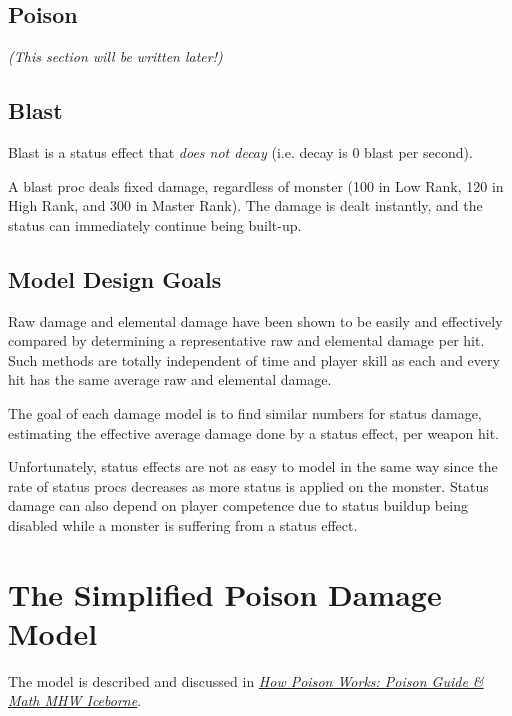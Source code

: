 \documentclass{article}
\begin{document}
\subsection{Poison}%
\label{sub:poison}

\textit{(This section will be written later!)}

\subsection{Blast}%
\label{sub:blast}

Blast is a status effect that \textit{does not decay} (i.e. decay is 0 blast per second).

A blast proc deals fixed damage, regardless of monster (100 in Low Rank, 120 in High Rank, and 300 in Master Rank). The damage is dealt instantly, and the status can immediately continue being built-up.

\subsection{Model Design Goals}%
\label{sub:model_design_goals}

Raw damage and elemental damage have been shown to be easily and effectively compared by determining a representative raw and elemental damage per hit. Such methods are totally independent of time and player skill as each and every hit has the same average raw and elemental damage.

The goal of each damage model is to find similar numbers for status damage, estimating the effective average damage done by a status effect, per weapon hit.

Unfortunately, status effects are not as easy to model in the same way since the rate of status procs decreases as more status is applied on the monster. Status damage can also depend on player competence due to status buildup being disabled while a monster is suffering from a status effect.


\newpage


\section{The Simplified Poison Damage Model}%
\label{sec:the_simplified_poison_damage_model}

The model is described and discussed in \href{https://www.youtube.com/watch?v=RwvUfNbLJPU}{\textit{How Poison Works: Poison Guide \& Math MHW Iceborne}}.
\end{document}
